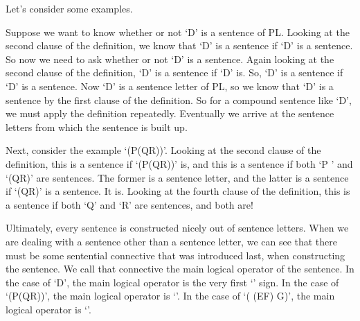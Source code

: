 Let’s consider some examples.

Suppose we want to know whether or not ‘\enot\enot\enot D’ is a sentence of PL. Looking at the second clause of the definition, we know that ‘\enot\enot\enot D’ is a sentence if ‘\enot\enot D’ is a sentence. So now we need to ask whether or not ‘\enot\enot D’ is a sentence. Again looking at the second clause of the definition, ‘\enot\enot D’ is a sentence if ‘\enot D’  is. So, ‘\enot D’ is a sentence if ‘D’ is a sentence. Now ‘D’ is a sentence letter of PL, so we know that ‘D’ is a sentence by the first clause of the definition. So for a compound sentence like ‘\enot\enot\enot D’, we must apply the definition repeatedly. Eventually we arrive at the sentence letters from which the sentence is built up.

Next, consider the example ‘\enot(P\eand \enot(\enot Q\eor  R))’. Looking at the second clause of the definition, this is a sentence if ‘(P\eand \enot(\enot Q\eor R))’ is, and this is a sentence if both ‘P ’ and ‘\enot(\enot Q\eor  R)’ are sentences. The former is a sentence letter, and the latter is a sentence if ‘(\enot Q\eor  R)’ is a sentence. It is. Looking at the fourth clause of the definition, this is a sentence if both ‘\enot Q’ and ‘R’ are sentences, and both are!

Ultimately, every sentence is constructed nicely out of sentence letters. When we are dealing with a sentence other than a sentence letter, we can see that there must be some sentential connective that was introduced last, when constructing the sentence. We call that connective the \gls{main logical operator} of the sentence. In the case of ‘\enot\enot\enot D’, the main logical operator is the very first ‘\enot’ sign. In the case of ‘(P\eand \enot(\enot Q\eor R))’, the main logical operator is ‘\eand’. In the case of ‘( (\enot E\eor  F) \eif  \enot\enot G)’, the main logical operator is ‘\eif ’.

